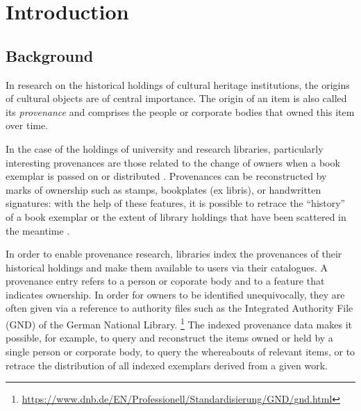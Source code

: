 \chapter{Introduction}
\label{chap:intro}

\section{Background}
\label{sec:background}


In research on the historical holdings of %
cultural heritage institutions,
the origins of cultural objects are of central importance.
The origin of an item is also called its \emph{provenance} 
and comprises the people or corporate bodies
that owned this item over time.

In the case of the holdings of university and research libraries,
particularly interesting provenances are those related to the change of
owners when a book exemplar is passed on or distributed \autocite[p.\,2]{Hakelberg2016}.
Provenances can be reconstructed by marks of ownership
such as stamps, bookplates (ex libris), or handwritten signatures:
with the help of these features, it is possible to retrace
the \enquote{history} of a book exemplar
or the extent of library holdings that have been scattered in the meantime \autocite[p.\,2]{Hakelberg2016}.

In order to enable provenance research,
libraries index the provenances of their historical holdings
and make them available to users via their catalogues.
A provenance entry refers to a person or coporate body
and to a feature that indicates ownership.
In order for owners to be identified unequivocally,
they are often given via a reference to authority files such as the
Integrated Authority File (GND) of the German National Library.%
\footnote{%
  \url{https://www.dnb.de/EN/Professionell/Standardisierung/GND/gnd.html}%
}
The indexed provenance data makes it possible, for example,
to query and reconstruct the items owned or held by a single person or corporate body,
to query the whereabouts of relevant items,
or to retrace the distribution of all indexed exemplars derived from a given work.


